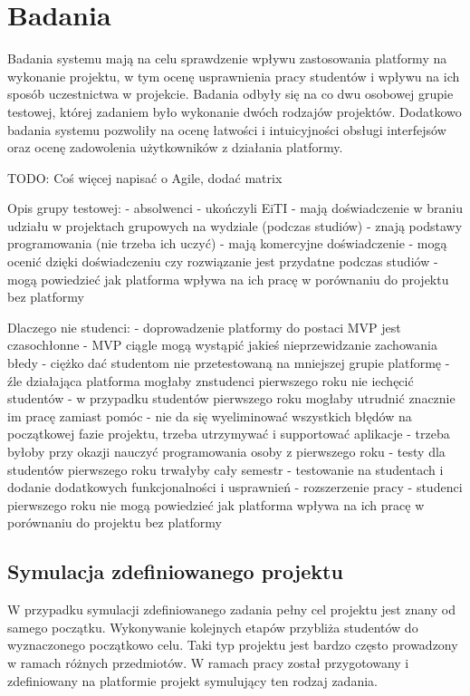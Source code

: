 \section{Badania}

Badania systemu mają na celu sprawdzenie wpływu zastosowania platformy na wykonanie projektu, w tym ocenę usprawnienia pracy studentów i wpływu na ich sposób uczestnictwa w projekcie.
Badania odbyły się na co dwu osobowej grupie testowej, której zadaniem było wykonanie dwóch rodzajów projektów.
Dodatkowo badania systemu pozwoliły na ocenę łatwości i intuicyjności obsługi interfejsów oraz ocenę zadowolenia użytkowników z działania platformy.

TODO: Coś więcej napisać o Agile, dodać matrix

Opis grupy testowej:
- absolwenci
- ukończyli EiTI
- mają doświadczenie w braniu udziału w projektach grupowych na wydziale (podczas studiów)
- znają podstawy programowania (nie trzeba ich uczyć)
- mają komercyjne doświadczenie
- mogą ocenić dzięki doświadczeniu czy rozwiązanie jest przydatne podczas studiów
- mogą powiedzieć jak platforma wpływa na ich pracę w porównaniu do projektu bez platformy

Dlaczego nie studenci:
- doprowadzenie platformy do postaci MVP jest czasochłonne
- MVP ciągle mogą wystąpić jakieś nieprzewidzanie zachowania błedy
- ciężko dać studentom nie przetestowaną na mniejszej grupie platformę
- źle działająca platforma mogłaby znstudenci pierwszego roku nie iechęcić studentów
- w przypadku studentów pierwszego roku mogłaby utrudnić znacznie im pracę zamiast pomóc
- nie da się wyeliminować wszystkich błędów na początkowej fazie projektu, trzeba utrzymywać i supportować aplikacje
- trzeba byłoby przy okazji nauczyć programowania osoby z pierwszego roku
- testy dla studentów pierwszego roku trwałyby cały semestr
- testowanie na studentach i dodanie dodatkowych funkcjonalności i usprawnień - rozszerzenie pracy
- studenci pierwszego roku nie mogą powiedzieć jak platforma wpływa na ich pracę w porównaniu do projektu bez platformy

\subsection{Symulacja zdefiniowanego projektu}

W przypadku symulacji zdefiniowanego zadania pełny cel projektu jest znany od samego początku.
Wykonywanie kolejnych etapów przybliża studentów do wyznaczonego początkowo celu.
Taki typ projektu jest bardzo często prowadzony w ramach różnych przedmiotów.
W ramach pracy został przygotowany i zdefiniowany na platformie projekt symulujący ten rodzaj zadania.

